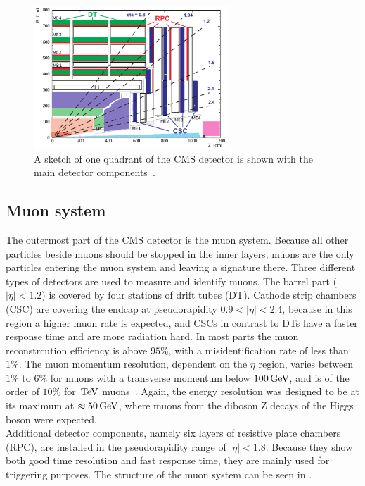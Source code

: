 \begin{figure}[tbp]
 \centering
 \includegraphics[width=0.65\textwidth]{figures/general/muonChamber}
 \caption{A sketch of one quadrant of the CMS detector is shown with the main detector components~\cite{CMSTDR}.}
 \label{fig:etaPlaneCMSTotal}
\end{figure}

\subsection{Muon system}
The outermost part of the CMS detector is the muon system. Because all other particles beside muons should be stopped in the inner layers, muons are the only particles entering the muon system and leaving a signature there. Three different types of detectors are used to measure and identify muons. The barrel part ($|\eta|<1.2$) is covered by four stations of drift tubes (DT). Cathode strip chambers (CSC) are covering the endcap at pseudorapidity $0.9<|\eta|<2.4$, because in this region a higher muon rate is expected, and CSCs in contrast to DTs have a faster response time and are more radiation hard. In most parts the muon reconstrcution efficiency is above $95\%$, with a misidentification rate of less than $1\%$. The muon momentum resolution, dependent on the $\eta$ region, varies between $1\%$ to $6\%$ for muons with a transverse momentum below $100\,\text{Ge\hspace{-.08em}V}$, and is of the order of $10\%$ for $\,\text{Te\hspace{-.08em}V}$ muons~\cite{MuonPerformance}. Again, the energy resolution was designed to be at its maximum at $\approx50\,\text{Ge\hspace{-.08em}V}$, where muons from the diboson Z decays of the Higgs boson were expected.\\
Additional detector components, namely six layers of resistive plate chambers (RPC), are installed in the pseudorapidity range of $|\eta|<1.8$. Because they show both good time resolution and fast response time, they are mainly used for triggering purposes. The structure of the muon system can be seen in .

